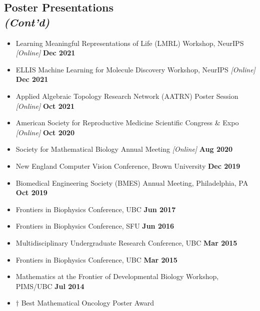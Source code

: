 \documentclass[margin,line]{res}
\begin{document}
\begin{resume}
\section{\sc Poster Presentations\\ \textit{(Cont'd)}}
{\renewcommand\leftmargini{0em}
\begin{itemize}
\setlength\itemsep{0.3em}
\item[] Learning Meaningful Representations of Life (LMRL) Workshop, NeurIPS \textit{[Online]} \hfill {\bf \small  Dec 2021}
\item[] ELLIS Machine Learning for Molecule Discovery Workshop, NeurIPS \textit{[Online]} \hfill {\bf \small  Dec 2021}
\item[] Applied Algebraic Topology Research Network (AATRN) Poster Session \textit{[Online]} \hfill {\bf \small  Oct 2021}
\item[] American Society for Reproductive Medicine Scientific Congress \& Expo \textit{[Online]} \hfill {\bf \small  Oct 2020}
\item[] Society for Mathematical Biology Annual Meeting\textsuperscript{\textdagger} \textit{[Online]} \hfill {\bf \small  Aug 2020}
\item[] New England Computer Vision Conference, Brown University \hfill {\bf \small  Dec 2019}
\item[] Biomedical Engineering Society (BMES) Annual Meeting, Philadelphia, PA \hfill {\bf \small  Oct 2019}
\item[] Frontiers in Biophysics Conference, UBC \hfill {\bf \small  Jun 2017}
\item[] Frontiers in Biophysics Conference, SFU \hfill {\bf \small Jun 2016}
\item[] Multidisciplinary Undergraduate Research Conference, UBC \hfill {\bf \small Mar 2015}
\item[] Frontiers in Biophysics Conference, UBC \hfill {\bf \small Mar 2015}
\item[] Mathematics at the Frontier of Developmental Biology Workshop, PIMS/UBC \hfill {\bf \small Jul 2014}
\item[] $\dagger$ Best Mathematical Oncology Poster Award

\end{itemize}}
\end{resume}
\end{document}
